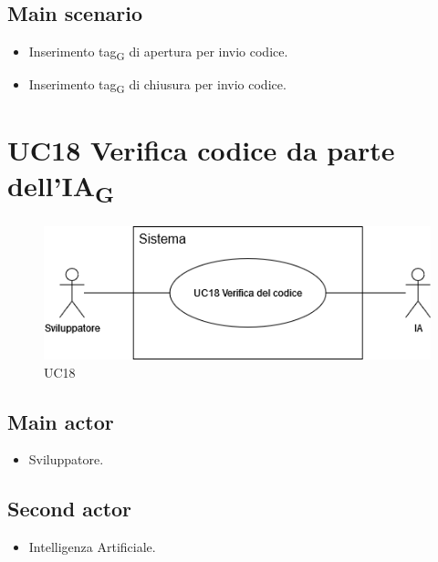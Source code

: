 \documentclass{article}
\begin{document}
    \subsection*{Main scenario}
        \begin{itemize}
            \item Inserimento tag\textsubscript{G} di apertura per invio codice.
            \item Inserimento tag\textsubscript{G} di chiusura per invio codice.
        \end{itemize}

        
        
\section{UC18 Verifica codice da parte dell'IA\textsubscript{G}}
    \begin{figure}[h]
      \centering
      \includegraphics[width=.8\textwidth, height=.6\textheight, keepaspectratio]{documenti/imgUML/UC18-VERIFICA-CODICE-IA.drawio.png}
        \caption{UC18}
      \label{fig:UC18}
    \end{figure}
    
    \subsection*{Main actor}
        \begin{itemize}
            \item Sviluppatore.
        \end{itemize}
    \subsection*{Second actor}
        \begin{itemize}
            \item Intelligenza Artificiale.
        \end{itemize}
    
\end{document}
